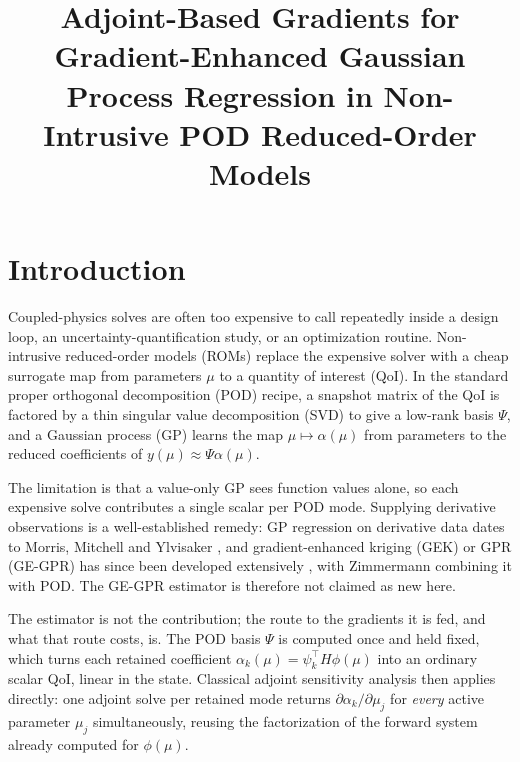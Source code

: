 \documentclass[]{ANStopical}
\title{Adjoint-Based Gradients for Gradient-Enhanced Gaussian Process
Regression in Non-Intrusive POD Reduced-Order Models}
\begin{document}
\section{Introduction}\label{sec:intro}

Coupled-physics solves are often too expensive to call repeatedly inside a design loop, an uncertainty-quantification study, or an optimization routine. Non-intrusive reduced-order models (ROMs) replace the expensive solver with a cheap surrogate map from parameters $\mu$ to a quantity of interest (QoI). In the standard proper orthogonal decomposition (POD) recipe, a snapshot matrix of the QoI is factored by a thin singular value decomposition (SVD) to give a low-rank basis $\Psi$, and a Gaussian process (GP) learns the map $\mu\mapsto\alpha(\mu)$ from parameters to the reduced coefficients of $y(\mu)\approx\Psi\alpha(\mu)$.

The limitation is that a value-only GP sees function values alone, so each expensive solve contributes a single scalar per POD mode. Supplying derivative observations is a well-established remedy: GP regression on derivative data dates to Morris, Mitchell and Ylvisaker \cite{morris_derivatives}, and gradient-enhanced kriging (GEK) or GPR (GE-GPR) has since been developed extensively \cite{backhaus_gek,ulaganathan_gek,han_wgek,bouhlel_gek,semler_weiser_gek,booth_gedgp}, with Zimmermann \cite{zimmermann_pod_gek} combining it with POD. The GE-GPR estimator is therefore not claimed as new here.

The estimator is not the contribution; the route to the gradients it is fed, and what that route costs, is. The POD basis $\Psi$ is computed once and held fixed, which turns each retained coefficient $\alpha_k(\mu)=\psi_k^\top H\phi(\mu)$ into an ordinary scalar QoI, linear in the state. Classical adjoint sensitivity analysis \cite{cacuci_sensitivity} then applies directly: one adjoint solve per retained mode returns $\partial\alpha_k/\partial\mu_j$ for \emph{every} active parameter $\mu_j$ simultaneously, reusing the factorization of the forward system already computed for $\phi(\mu)$.
\end{document}
